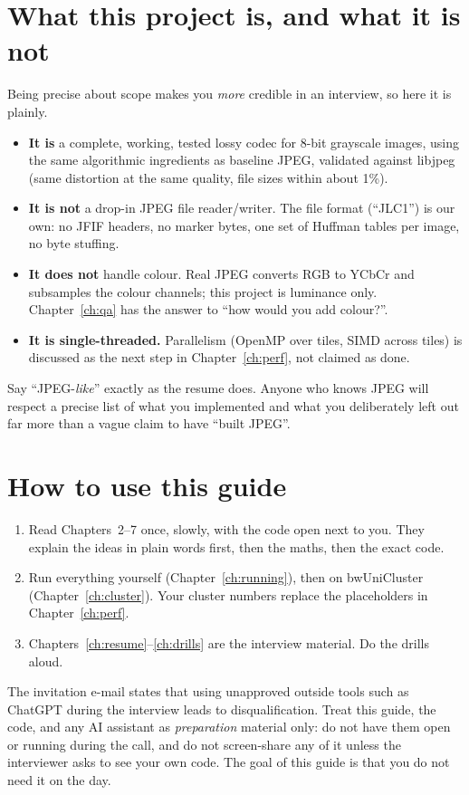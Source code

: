 \section{What this project is, and what it is not}

Being precise about scope makes you \emph{more} credible in an interview, so here it is plainly.

\begin{itemize}
\item \textbf{It is} a complete, working, tested lossy codec for 8-bit grayscale images, using the same algorithmic ingredients as baseline JPEG, validated against libjpeg (same distortion at the same quality, file sizes within about 1\%).
\item \textbf{It is not} a drop-in JPEG file reader/writer. The file format (``JLC1'') is our own: no JFIF headers, no marker bytes, one set of Huffman tables per image, no byte stuffing.
\item \textbf{It does not} handle colour. Real JPEG converts RGB to YCbCr and subsamples the colour channels; this project is luminance only. Chapter~\ref{ch:qa} has the answer to ``how would you add colour?''.
\item \textbf{It is single-threaded.} Parallelism (OpenMP over tiles, SIMD across tiles) is discussed as the next step in Chapter~\ref{ch:perf}, not claimed as done.
\end{itemize}

\begin{warn}
Say ``JPEG-\emph{like}'' exactly as the resume does. Anyone who knows JPEG will respect a precise list of what you implemented and what you deliberately left out far more than a vague claim to have ``built JPEG''.
\end{warn}

\section{How to use this guide}

\begin{enumerate}
\item Read Chapters~2--7 once, slowly, with the code open next to you. They explain the ideas in plain words first, then the maths, then the exact code.
\item Run everything yourself (Chapter~\ref{ch:running}), then on bwUniCluster (Chapter~\ref{ch:cluster}). Your cluster numbers replace the placeholders in Chapter~\ref{ch:perf}.
\item Chapters~\ref{ch:resume}--\ref{ch:drills} are the interview material. Do the drills aloud.
\end{enumerate}

\begin{warn}
The invitation e-mail states that using unapproved outside tools such as ChatGPT during the interview leads to disqualification. Treat this guide, the code, and any AI assistant as \emph{preparation} material only: do not have them open or running during the call, and do not screen-share any of it unless the interviewer asks to see your own code. The goal of this guide is that you do not need it on the day.
\end{warn}
